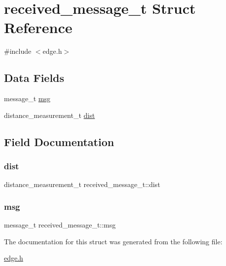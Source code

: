 \hypertarget{structreceived__message__t}{}\section{received\+\_\+message\+\_\+t Struct Reference}
\label{structreceived__message__t}


{\ttfamily \#include $<$edge.\+h$>$}

\subsection*{Data Fields}
\begin{DoxyCompactItemize}
\item 
message\+\_\+t \hyperlink{structreceived__message__t_a223f84d6d73ebf69b757469cd3db62c1}{msg}
\item 
distance\+\_\+measurement\+\_\+t \hyperlink{structreceived__message__t_a57bc4d2fe496b095f35dea0edd9bfd97}{dist}
\end{DoxyCompactItemize}


\subsection{Field Documentation}
\mbox{\label{structreceived__message__t_a57bc4d2fe496b095f35dea0edd9bfd97}} 
\subsubsection{\texorpdfstring{dist}{dist}}
{\footnotesize\ttfamily distance\+\_\+measurement\+\_\+t received\+\_\+message\+\_\+t\+::dist}

\mbox{\label{structreceived__message__t_a223f84d6d73ebf69b757469cd3db62c1}} 
\subsubsection{\texorpdfstring{msg}{msg}}
{\footnotesize\ttfamily message\+\_\+t received\+\_\+message\+\_\+t\+::msg}



The documentation for this struct was generated from the following file\+:\begin{DoxyCompactItemize}
\item 
\hyperlink{edge_8h}{edge.\+h}\end{DoxyCompactItemize}
